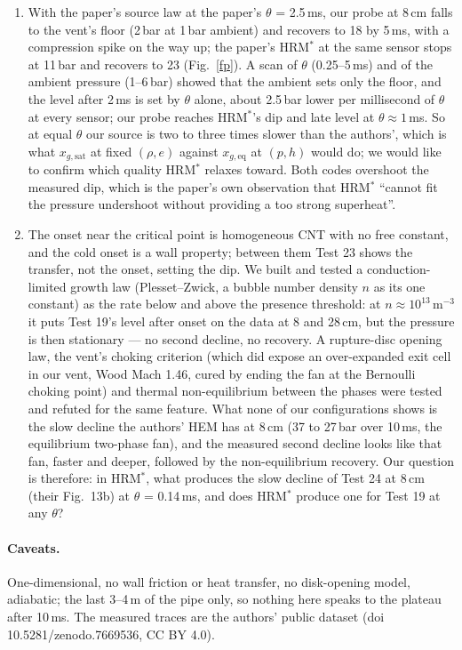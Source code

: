 \documentclass[11pt,a4paper]{article}
\begin{document}
\begin{enumerate}
\item With the paper's source law at the paper's $\theta$ = 2.5\,ms, our probe at 8\,cm falls to the vent's floor (2\,bar at 1\,bar ambient) and recovers to 18 by 5\,ms, with a compression spike on the way up; the paper's HRM$^*$ at the same sensor stops at 11\,bar and recovers to 23 (Fig.~\ref{fp}). A scan of $\theta$ (0.25--5\,ms) and of the ambient pressure (1--6\,bar) showed that the ambient sets only the floor, and the level after 2\,ms is set by $\theta$ alone, about 2.5\,bar lower per millisecond of $\theta$ at every sensor; our probe reaches HRM$^*$'s dip and late level at $\theta \approx 1$\,ms. So at equal $\theta$ our source is two to three times slower than the authors', which is what $x_{g,\mathrm{sat}}$ at fixed $(\rho, e)$ against $x_{g,\mathrm{eq}}$ at $(p, h)$ would do; we would like to confirm which quality HRM$^*$ relaxes toward. Both codes overshoot the measured dip, which is the paper's own observation that HRM$^*$ ``cannot fit the pressure undershoot without providing a too strong superheat''.
\item The onset near the critical point is homogeneous CNT with no free constant, and the cold onset is a wall property; between them Test 23 shows the transfer, not the onset, setting the dip. We built and tested a conduction-limited growth law (Plesset--Zwick, a bubble number density $n$ as its one constant) as the rate below and above the presence threshold: at $n \approx 10^{13}$\,m$^{-3}$ it puts Test 19's level after onset on the data at 8 and 28\,cm, but the pressure is then stationary --- no second decline, no recovery. A rupture-disc opening law, the vent's choking criterion (which did expose an over-expanded exit cell in our vent, Wood Mach 1.46, cured by ending the fan at the Bernoulli choking point) and thermal non-equilibrium between the phases were tested and refuted for the same feature. What none of our configurations shows is the slow decline the authors' HEM has at 8\,cm (37 to 27\,bar over 10\,ms, the equilibrium two-phase fan), and the measured second decline looks like that fan, faster and deeper, followed by the non-equilibrium recovery. Our question is therefore: in HRM$^*$, what produces the slow decline of Test 24 at 8\,cm (their Fig.~13b) at $\theta$ = 0.14\,ms, and does HRM$^*$ produce one for Test 19 at any $\theta$?
\end{enumerate}

\paragraph{Caveats.} One-dimensional, no wall friction or heat transfer, no disk-opening model, adiabatic; the last 3--4\,m of the pipe only, so nothing here speaks to the plateau after 10\,ms. The measured traces are the authors' public dataset (doi 10.5281/zenodo.7669536, CC BY 4.0).
\end{document}

